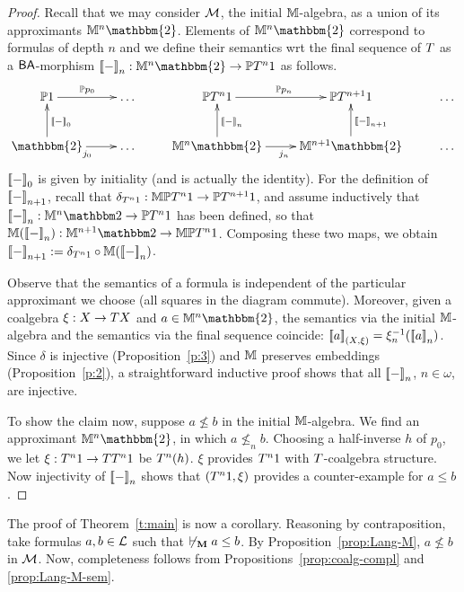 \documentclass{book}
\begin{document}
\begin{proof}
  Recall that we may consider $\mathcal{M}$, the initial $\mathbb{M}$-algebra, as a
  union of its approximants $\xxviM^n\mathbbm{2}$.  Elements of
  $\xxviM^n\mathbbm{2}$ correspond to formulas of depth $n$ and we define
  their semantics wrt the final sequence of $T$ as a $\mathsf{BA}$-morphism
  $\xxvisem{-}_n:\xxviM^n\mathbbm{2}\to \xxviPal\xxviF^n 1$ as follows.
\begin{equation}
  \xymatrix{
    \xxviPal 1\ar[r]^{\xxviPal p_0} & \ldots
    & \xxviPal\xxviF^n 1\ar[r]^{\xxviPal p_n}
    & \xxviPal\xxviF^{n+1} 1 & \ldots\\
    \mathbbm{2}\ar[u]_{\xxvisem{-}_0}\ar[r]_{j_0} & \ldots
    & \xxviM^n\mathbbm{2}\ar[u]_{\xxvisem{-}_n}\ar[r]_{j_n}
    & \xxviM^{n+1}\mathbbm{2}\ar[u]_{\xxvisem{-}_{n+1}} & \ldots
  }
\end{equation}
$\mathopen{[\![} - \mathclose{]\!]}_0$ is given by initiality (and is actually the identity).
For the definition of $\mathopen{[\![} - \mathclose{]\!]}_{n+1}$, recall that $\delta_{T^{n}1}:
\mathbb{M}\mathbb{P} T^{n}1 \to \mathbb{P} T^{n+1} 1$, and assume inductively that
$\xxvisem{-}_{n}: \xxviM^{n}\xxvibbtwo \to \xxviPal \xxviF^{n}1$ has been defined, so that
$\xxviM (\xxvisem{-}_{n}) : \xxviM^{n+1}\xxvibbtwo \to \xxviM\xxviPal \xxviF^{n}1$.  Composing
these two maps, we obtain $\mathopen{[\![} - \mathclose{]\!]}_{n+1} := \delta_{T^n 1}
\circ\mathbb{M}(\mathopen{[\![} - \mathclose{]\!]}_n)$.

Observe that the semantics of a formula is independent of the
particular approximant we choose (all squares in the diagram commute).
Moreover, given a coalgebra $\xi:X\to T X$ and $a\in\xxviM^n\mathbbm{2}$,
the semantics via the initial $\mathbb{M}$-algebra and the semantics via the
final sequence coincide: $\mathopen{[\![} a \mathclose{]\!]}_{(X,\xi)}=\xi_n^{-1}(\mathopen{[\![} a \mathclose{]\!]}_n)$.
Since $\delta$ is injective (Proposition~\ref{p:3}) and $\mathbb{M}$ preserves
embeddings (Proposition~\ref{p:2}), a straightforward inductive proof
shows that all $\mathopen{[\![} - \mathclose{]\!]}_n$, $n\in\omega$, are injective.

To show the claim now, suppose $a\not\le b$ in the initial
$\mathbb{M}$-algebra.  We find an approximant $\xxviM^n\mathbbm{2}$, in which
$a\not\le_n b$.  Choosing a half-inverse $h$ of $p_0$, we let $\xi:
T^{n}1 \to TT^{n}1$ be $T^n(h)$. $\xi$ provides $T^n{1}$ with
$T$-coalgebra structure.  Now injectivity of $\mathopen{[\![} - \mathclose{]\!]}_n$ shows that
$(T^n{1},\xi)$ provides a counter-example for $a\le b$.
\end{proof}

\noindent The proof of Theorem~\ref{t:main} is now a corollary.
Reasoning by contraposition, take formulas $a,b \in \mathcal{L}$ such that
$\not\vdash_{\mathbf{M}} a \leq b$. By Proposition~\ref{prop:Lang-M},
$a\not\le b$ in $\mathcal{M}$. Now, completeness follows from
Propositions~\ref{prop:coalg-compl} and \ref{prop:Lang-M-sem}.
\end{document}
